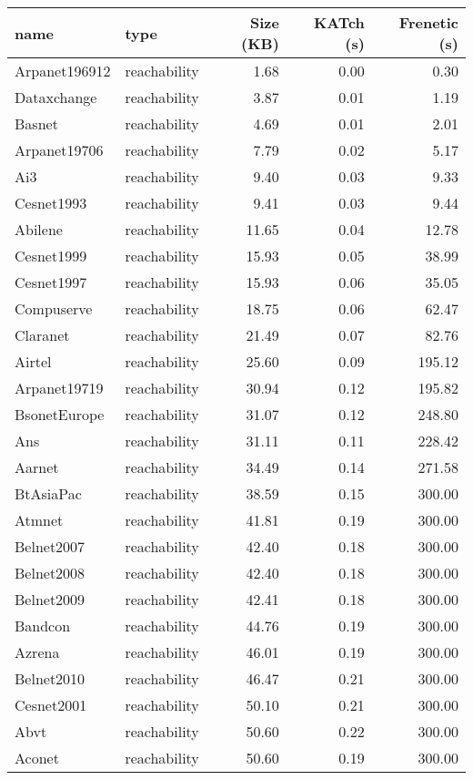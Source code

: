 \begin{tabular}{llrrr}
\toprule
name & type & Size (KB) & KATch (s) & Frenetic (s) \\
\midrule
Arpanet196912 & reachability & 1.68 & 0.00 & 0.30 \\
Dataxchange & reachability & 3.87 & 0.01 & 1.19 \\
Basnet & reachability & 4.69 & 0.01 & 2.01 \\
Arpanet19706 & reachability & 7.79 & 0.02 & 5.17 \\
Ai3 & reachability & 9.40 & 0.03 & 9.33 \\
Cesnet1993 & reachability & 9.41 & 0.03 & 9.44 \\
Abilene & reachability & 11.65 & 0.04 & 12.78 \\
Cesnet1999 & reachability & 15.93 & 0.05 & 38.99 \\
Cesnet1997 & reachability & 15.93 & 0.06 & 35.05 \\
Compuserve & reachability & 18.75 & 0.06 & 62.47 \\
Claranet & reachability & 21.49 & 0.07 & 82.76 \\
Airtel & reachability & 25.60 & 0.09 & 195.12 \\
Arpanet19719 & reachability & 30.94 & 0.12 & 195.82 \\
BsonetEurope & reachability & 31.07 & 0.12 & 248.80 \\
Ans & reachability & 31.11 & 0.11 & 228.42 \\
Aarnet & reachability & 34.49 & 0.14 & 271.58 \\
BtAsiaPac & reachability & 38.59 & 0.15 & 300.00 \\
Atmnet & reachability & 41.81 & 0.19 & 300.00 \\
Belnet2007 & reachability & 42.40 & 0.18 & 300.00 \\
Belnet2008 & reachability & 42.40 & 0.18 & 300.00 \\
Belnet2009 & reachability & 42.41 & 0.18 & 300.00 \\
Bandcon & reachability & 44.76 & 0.19 & 300.00 \\
Azrena & reachability & 46.01 & 0.19 & 300.00 \\
Belnet2010 & reachability & 46.47 & 0.21 & 300.00 \\
Cesnet2001 & reachability & 50.10 & 0.21 & 300.00 \\
Abvt & reachability & 50.60 & 0.22 & 300.00 \\
Aconet & reachability & 50.60 & 0.19 & 300.00 \\

\end{tabular}
